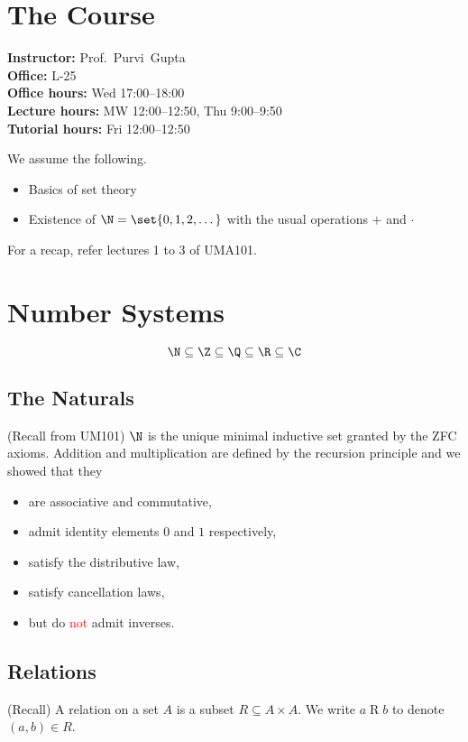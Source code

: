 \chapter*{The Course} \label{chp:course}
\textbf{Instructor:} Prof.~Purvi~Gupta\\
\textbf{Office:} L-25\\
\textbf{Office hours:} Wed 17:00--18:00\\
\textbf{Lecture hours:} MW 12:00--12:50, Thu 9:00--9:50\\
\textbf{Tutorial hours:} Fri 12:00--12:50

We assume the following.
\begin{itemize}
    \item Basics of set theory
    \item Existence of $\N = \set{0, 1, 2, \dots}$ with the usual operations
    $+$ and $\cdot$
\end{itemize}
For a recap, refer lectures 1 to 3 of UMA101.

\chapter{Number Systems} \label{chp:number_systems}
\[
    \N \subseteq \Z \subseteq \Q \subseteq \R \subseteq \C
\]
\section{The Naturals} \label{sec:naturals}
(Recall from UM101) $\N$ is the unique minimal inductive set granted by the
ZFC axioms.
Addition and multiplication are defined by the recursion principle
and we showed that they
\begin{itemize}
    \item are associative and commutative,
    \item admit identity elements $0$ and $1$ respectively,
    \item satisfy the distributive law,
    \item satisfy cancellation laws,
    \item but do \textcolor{Red}{not} admit inverses.
\end{itemize}

\section{Relations} \label{sec:relations}
(Recall) A relation on a set $A$ is a subset $R \subseteq A \times A$.
We write $a \mathrel{R} b$ to denote $(a, b) \in R$.

